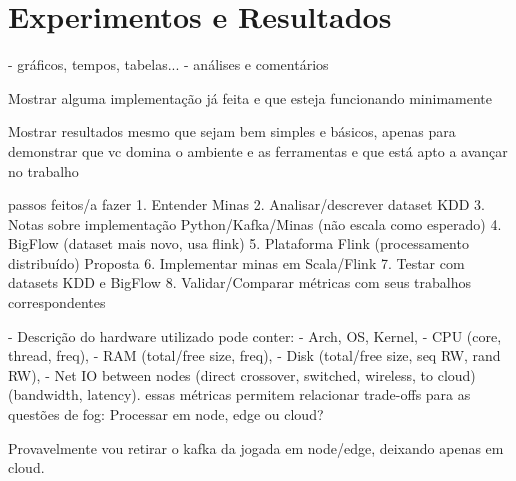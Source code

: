 \section{Experimentos e Resultados}
    - gráficos, tempos, tabelas...
    - análises e comentários

Mostrar alguma implementação já feita e que esteja funcionando minimamente

Mostrar resultados mesmo que sejam bem simples e básicos,
apenas para demonstrar que vc domina o ambiente e as ferramentas e
que está apto a avançar no trabalho 

passos feitos/a fazer
1. Entender Minas
2. Analisar/descrever dataset KDD
3. Notas sobre implementação Python/Kafka/Minas (não escala como esperado)
4. BigFlow (dataset mais novo, usa flink)
5. Plataforma Flink (processamento distribuído)
Proposta
6. Implementar minas em Scala/Flink
7. Testar com datasets KDD e BigFlow
8. Validar/Comparar métricas com seus trabalhos correspondentes

- Descrição do hardware utilizado pode conter:
    - Arch, OS, Kernel,
    - CPU (core, thread, freq),
    - RAM (total/free size, freq),
    - Disk (total/free size, seq RW, rand RW),
    - Net IO between nodes (direct crossover, switched, wireless, to cloud) (bandwidth, latency).
essas métricas permitem relacionar trade-offs para as questões de fog: Processar em node, edge ou cloud?

Provavelmente vou retirar o kafka da jogada em node/edge, deixando apenas em cloud.
